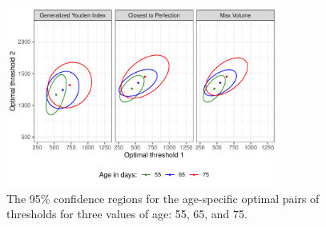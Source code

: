 \begin{figure}[htbp]
  \centering
  \includegraphics[width=0.8\textwidth]{optThres_ellip.pdf}
  \caption{The 95\% confidence regions for the age-specific optimal pairs of thresholds for three values of age: 55, 65, and 75.}
  \label{fig:optThresh}
\end{figure}

